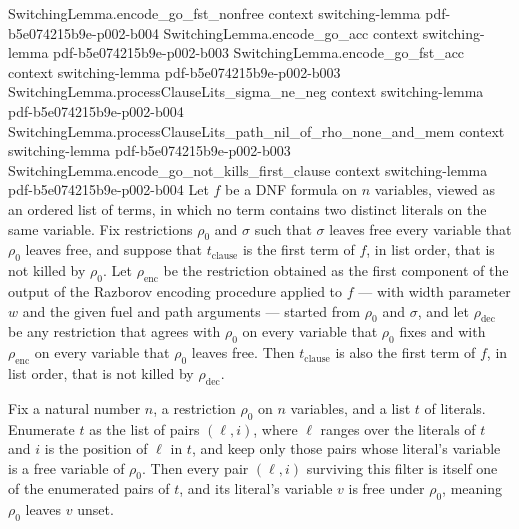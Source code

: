 \begin{lemma}
\proofstep
  {SwitchingLemma.encode_go_fst_nonfree}
  {context}
  {switching-lemma}
  {pdf-b5e074215b9e-p002-b004}
\proofstep
  {SwitchingLemma.encode_go_acc}
  {context}
  {switching-lemma}
  {pdf-b5e074215b9e-p002-b003}
\proofstep
  {SwitchingLemma.encode_go_fst_acc}
  {context}
  {switching-lemma}
  {pdf-b5e074215b9e-p002-b003}
\proofstep
  {SwitchingLemma.processClauseLits_sigma_ne_neg}
  {context}
  {switching-lemma}
  {pdf-b5e074215b9e-p002-b004}
\proofstep
  {SwitchingLemma.processClauseLits_path_nil_of_rho_none_and_mem}
  {context}
  {switching-lemma}
  {pdf-b5e074215b9e-p002-b003}
\proofstep
  {SwitchingLemma.encode_go_not_kills_first_clause}
  {context}
  {switching-lemma}
  {pdf-b5e074215b9e-p002-b004}
Let $f$ be a DNF formula on $n$ variables, viewed as an ordered list of terms, in which
no term contains two distinct literals on the same variable. Fix restrictions $\rho_0$
and $\sigma$ such that $\sigma$ leaves free every variable that $\rho_0$ leaves free,
and suppose that $t_{\mathrm{clause}}$ is the first term of $f$, in list order, that is
not killed by $\rho_0$. Let $\rho_{\mathrm{enc}}$ be the restriction obtained as the
first component of the output of the Razborov encoding procedure applied to $f$ — with
width parameter $w$ and the given fuel and path arguments — started from $\rho_0$ and
$\sigma$, and let $\rho_{\mathrm{dec}}$ be any restriction that agrees with $\rho_0$ on
every variable that $\rho_0$ fixes and with $\rho_{\mathrm{enc}}$ on every variable that
$\rho_0$ leaves free. Then $t_{\mathrm{clause}}$ is also the first term of $f$, in list
order, that is not killed by $\rho_{\mathrm{dec}}$.
\end{lemma}

\begin{lemma}
\label{SwitchingLemma.mem_filter_freeVars_zipIdx}
\leanok
{}
Fix a natural number $n$, a restriction $\rho_0$ on $n$ variables, and a list $t$ of
literals. Enumerate $t$ as the list of pairs $(\ell, i)$, where $\ell$ ranges over the
literals of $t$ and $i$ is the position of $\ell$ in $t$, and keep only those pairs
whose literal's variable is a free variable of $\rho_0$. Then every pair $(\ell, i)$
surviving this filter is itself one of the enumerated pairs of $t$, and its literal's
variable $v$ is free under $\rho_0$, meaning $\rho_0$ leaves $v$ unset.
\end{lemma}

